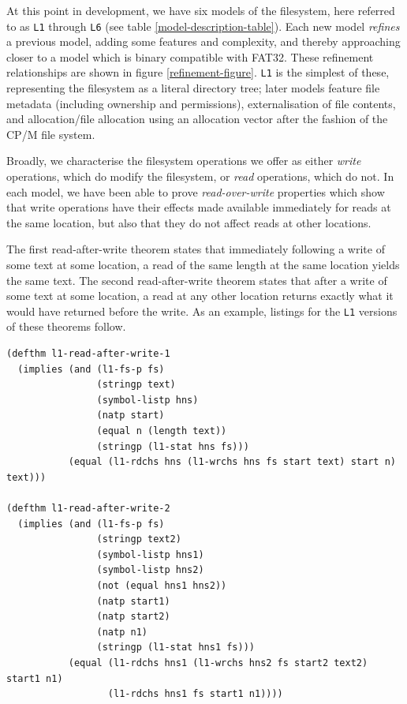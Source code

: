 \documentclass[runningheads,a4paper]{llncs}
\begin{document}
At this point in development, we have six models of the filesystem,
here referred to as \texttt{L1} through \texttt{L6} (see
table \ref{model-description-table}). Each new model
\textit{refines} a previous model, adding some features and
complexity, and thereby approaching closer to a model which is binary
compatible with FAT32. These refinement relationships are shown in
figure \ref{refinement-figure}. \texttt{L1} is the simplest of these,
representing the filesystem as a literal directory tree; later models feature
file metadata (including ownership and permissions), externalisation
of file contents, and allocation/file allocation using an allocation
vector after the fashion of the CP/M file system.

Broadly, we characterise the filesystem
operations we offer as either \textit{write} operations, which do
modify the filesystem, or \textit{read} operations, which do not. In
each model, we have been able to prove \textit{read-over-write}
properties which show that write operations have
their effects made available immediately for reads at the same
location, but also that they do not affect reads at other locations.

The first read-after-write theorem states that immediately following a
write of some text at some location, a read of the same length at the
same location yields the same text. The second read-after-write
theorem states that after a write of some text at some location, a
read at any other location returns exactly what it would have returned
before the write. As an example, listings for the \texttt{L1} versions
of these theorems follow.

\medskip

\noindent
\begin{verbatim}
(defthm l1-read-after-write-1
  (implies (and (l1-fs-p fs)
                (stringp text)
                (symbol-listp hns)
                (natp start)
                (equal n (length text))
                (stringp (l1-stat hns fs)))
           (equal (l1-rdchs hns (l1-wrchs hns fs start text) start n) text)))

(defthm l1-read-after-write-2
  (implies (and (l1-fs-p fs)
                (stringp text2)
                (symbol-listp hns1)
                (symbol-listp hns2)
                (not (equal hns1 hns2))
                (natp start1)
                (natp start2)
                (natp n1)
                (stringp (l1-stat hns1 fs)))
           (equal (l1-rdchs hns1 (l1-wrchs hns2 fs start2 text2) start1 n1)
                  (l1-rdchs hns1 fs start1 n1))))
\end{verbatim}
\end{document}
